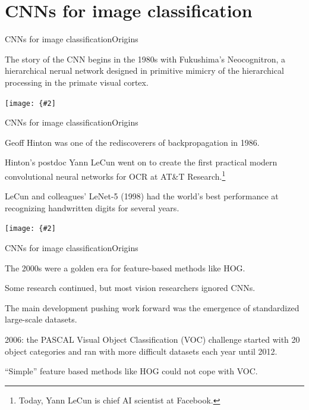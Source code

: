 \documentclass{beamer}
\newcommand{\myfig}[3]{\centerline{\texttt{[image: \{\#2]}}}
\begin{document}
\section{CNNs for image classification}

\begin{frame}{CNNs for image classification}{Origins}

  The story of the CNN begins in the 1980s with Fukushima's
  \alert{Neocognitron}, a hierarchical nerual network designed in
  primitive mimicry of the hierarchical processing in the primate
  visual cortex.

  \medskip

  \myfig{3.5in}{fukushima-fig2}{Fukushima (1980), Fig.\ 2}

\end{frame}


\begin{frame}{CNNs for image classification}{Origins}

  Geoff Hinton was one of the rediscoverers of backpropagation in 1986.

  \medskip

  Hinton's postdoc Yann LeCun went on to create the first practical
  modern convolutional neural networks for OCR at AT\&T
  Research.\footnote{Today, Yann LeCun is chief AI scientist at
    Facebook.}

  \medskip

  LeCun and colleagues' LeNet-5 (1998) had the world's best
  performance at recognizing handwritten digits for several years.

  \medskip

  \myfig{4in}{lecun-fig2}{LeCun et al.\ (1998), Fig.\ 2}

\end{frame}


\begin{frame}{CNNs for image classification}{Origins}

  The 2000s were a golden era for feature-based methods like HOG.

  \medskip

  Some research continued, but most vision researchers ignored CNNs.

  \medskip

  The main development pushing work forward was the emergence of
  \alert{standardized large-scale datasets}.

  \medskip

  2006: the PASCAL Visual Object Classification (VOC) challenge
  started with 20 object categories and ran with more difficult
  datasets each year until 2012.

  \medskip

  ``Simple'' feature based methods like HOG could not cope with VOC.

\end{frame}
\end{document}
